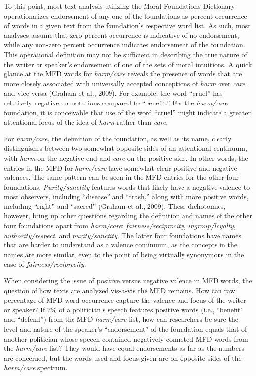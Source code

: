 \documentclass[english,,man]{apa6}
\begin{document}
To this point, most text analysis utilizing the Moral Foundations
Dictionary operationalizes endorsement of any one of the foundations as
percent occurrence of words in a given text from the foundation's
respective word list. As such, most analyses assume that zero percent
occurrence is indicative of no endorsement, while any non-zero percent
occurrence indicates endorsement of the foundation. This operational
definition may not be sufficient in describing the true nature of the
writer or speaker's endorsement of one of the sets of moral intuitions.
A quick glance at the MFD words for \emph{harm/care} reveals the
presence of words that are more closely associated with universally
accepted conceptions of \emph{harm} over \emph{care} and vice-versa
(Graham et al., 2009). For example, the word \enquote{cruel} has
relatively negative connotations compared to \enquote{benefit.} For the
\emph{harm/care} foundation, it is conceivable that use of the word
\enquote{cruel} might indicate a greater attentional focus of the idea
of \emph{harm} rather than \emph{care}.

For \emph{harm/care}, the definition of the foundation, as well as its
name, clearly distinguishes between two somewhat opposite sides of an
attentional continuum, with \emph{harm} on the negative end and
\emph{care} on the positive side. In other words, the entries in the MFD
for \emph{harm/care} have somewhat clear positive and negative valences.
The same pattern can be seen in the MFD entries for the other four
foundations. \emph{Purity/sanctity} features words that likely have a
negative valence to most observers, including \enquote{disease} and
\enquote{trash,} along with more positive words, including
\enquote{right} and \enquote{sacred} (Graham et al., 2009). These
dichotomies, however, bring up other questions regarding the definition
and names of the other four foundations apart from \emph{harm/care}:
\emph{fairness/reciprocity}, \emph{ingroup/loyalty},
\emph{authority/respect}, and \emph{purity/sanctity}. The latter four
foundations have names that are harder to understand as a valence
continuum, as the concepts in the names are more similar, even to the
point of being virtually synonymous in the case of
\emph{fairness/reciprocity}.

When considering the issue of positive versus negative valence in MFD
words, the question of how texts are analyzed vis-a-vis the MFD remains.
How can raw percentage of MFD word occurrence capture the valence and
focus of the writer or speaker? If 2\% of a politician's speech features
positive words (i.e., \enquote{benefit} and \enquote{defend}) from the
MFD \emph{harm/care} list, how can researchers be sure the level and
nature of the speaker's \enquote{endorsement} of the foundation equals
that of another politician whose speech contained negatively connoted
MFD words from the \emph{harm/care} list? They would have equal
endorsements as far as the numbers are concerned, but the words used and
focus given are on opposite sides of the \emph{harm/care} spectrum.
\end{document}
